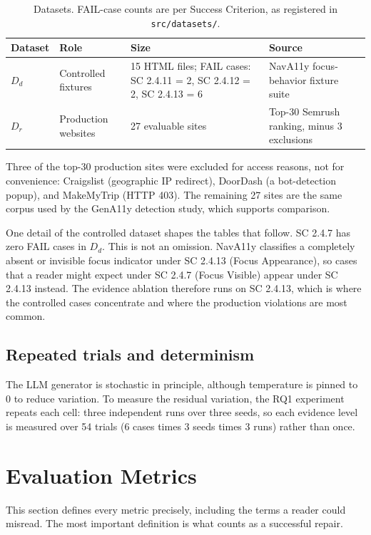 \documentclass[11pt]{article}
\newcommand{\Dd}{\ensuremath{D_d}}
\newcommand{\Dr}{\ensuremath{D_r}}
\begin{document}
\begin{table}[h]
\centering
\caption{Datasets. FAIL-case counts are per Success Criterion, as registered in
\texttt{src/datasets/}.}
\label{tab:data}
\begin{tabular}{p{1.6cm}p{2.6cm}p{5.5cm}p{3cm}}
\toprule
Dataset & Role & Size & Source \\
\midrule
\Dd & Controlled fixtures & 15 HTML files; FAIL cases: SC 2.4.11 = 2, SC 2.4.12 = 2, SC 2.4.13 = 6 & NavA11y focus-behavior fixture suite \\
\Dr & Production websites & 27 evaluable sites & Top-30 Semrush ranking, minus 3 exclusions \\
\bottomrule
\end{tabular}
\end{table}

Three of the top-30 production sites were excluded for access reasons, not for
convenience: Craigslist (geographic IP redirect), DoorDash (a bot-detection popup),
and MakeMyTrip (HTTP 403). The remaining 27 sites are the same corpus used by the
GenA11y detection study, which supports comparison.

One detail of the controlled dataset shapes the tables that follow. SC 2.4.7 has zero
FAIL cases in \Dd. This is not an omission. NavA11y classifies a completely absent or
invisible focus indicator under SC 2.4.13 (Focus Appearance), so cases that a reader
might expect under SC 2.4.7 (Focus Visible) appear under SC 2.4.13 instead. The
evidence ablation therefore runs on SC 2.4.13, which is where the controlled cases
concentrate and where the production violations are most common.

\subsection{Repeated trials and determinism}

The LLM generator is stochastic in principle, although temperature is pinned to 0 to
reduce variation. To measure the residual variation, the RQ1 experiment repeats each
cell: three independent runs over three seeds, so each evidence level is measured over
54 trials (6 cases times 3 seeds times 3 runs) rather than once.

\section{Evaluation Metrics}

This section defines every metric precisely, including the terms a reader could
misread. The most important definition is what counts as a successful repair.
\end{document}
